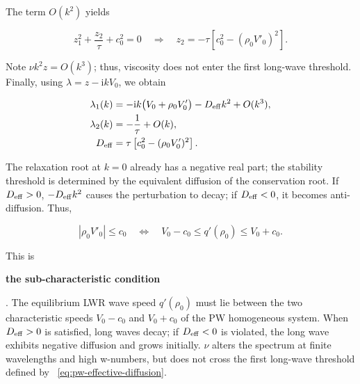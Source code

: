 \documentclass[11pt,a4paper,openany]{book}
\numberwithin{equation}{chapter}
\numberwithin{figure}{chapter}
\numberwithin{table}{chapter}
\begin{document}
The term $O(k^2)$ yields

\begin{equation}
z_1^2+\frac{z_2}{\tau}+c_0^2=0
\quad\Longrightarrow\quad
z_2=-\tau\left[c_0^2-(\rho_0V'_0)^2\right].
\end{equation}

Note $\nu k^2z=O(k^3)$; thus, viscosity does not enter the first long-wave threshold. Finally, using $\lambda=z-\mathrm{i}kV_0$, we obtain







\begin{subequations}
\label{eq:pw-long-wave-roots}
\begin{align}
\lambda_1(k)
&=-\mathrm{i}k\bigl(V_0+\rho_0V'_0\bigr)
-D_{\rm eff}k^2+O(k^3),
\label{eq:pw-hydro-root}\\
\lambda_2(k)
&=-\frac{1}{\tau}+O(k),
\label{eq:pw-relax-root}\\
D_{\rm eff}
&=\tau\left[c_0^2-(\rho_0V'_0)^2\right].
\label{eq:pw-effective-diffusion}
\end{align}
\end{subequations}







The relaxation root at $k=0$ already has a negative real part; the stability threshold is determined by the equivalent diffusion of the conservation root. If $D_{\rm eff}>0$, $-D_{\rm eff}k^2$ causes the perturbation to decay; if $D_{\rm eff}<0$, it becomes anti-diffusion. Thus,

\begin{equation}
\boxed{|\rho_0V'_0|\le c_0}
\quad\Longleftrightarrow\quad
V_0-c_0\le q'(\rho_0)\le V_0+c_0.
\label{eq:pw-subcharacteristic}
\end{equation}

This is




\textbf{the sub-characteristic condition}




. The equilibrium LWR wave speed $q'(\rho_0)$ must lie between the two characteristic speeds $V_0-c_0$ and $V_0+c_0$ of the PW homogeneous system. When $D_{\rm eff}>0$ is satisfied, long waves decay; if $D_{\rm eff}<0$ is violated, the long wave exhibits negative diffusion and grows initially. $\nu$ alters the spectrum at finite wavelengths and high w-numbers, but does not cross the first long-wave threshold defined by ~\eqref{eq:pw-effective-diffusion}.
\end{document}
